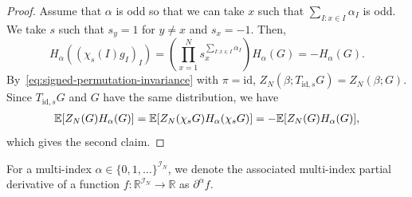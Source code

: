 \documentclass[../CLT_SYK.tex]{subfiles}
\begin{document}
\begin{proof}
Assume that $\alpha$ is odd so that  we can take $x$ such that
$\sum_{I:x\in I}\alpha_I$ is odd.  We take $s$ such that $s_y=1$ for
$y\neq x$ and $s_x=-1$.  Then,
 \[
  H_\alpha((\chi_s(I)g_I)_I)
  =
  \left(
    \prod_{x=1}^N
    s_x^{{\sum_{I:x\in I}}\alpha_I}
  \right)H_\alpha(G) = -H_\alpha(G).
\]
{
By~\eqref{eq:signed-permutation-invariance} with $\pi=\mathrm{id}$,
$Z_N(\beta;T_{\mathrm{id},s}G)=Z_N(\beta;G)$.
Since $T_{\mathrm{id},s}G$ and $G$ have the same distribution}, we have
\begin{align*}{
\mathbb E[Z_N(G) H_\alpha(G)] = \mathbb E[Z_N(\chi_s G) H_\alpha(\chi_s G)] = -
\mathbb E[Z_N(G) H_\alpha(G)]}, 
\end{align*}
which gives the second claim.
\end{proof}

For a multi-index $\alpha \in \{0,1,\ldots\}^{\mathcal I_N}$, we denote the associated multi-index partial derivative of a function $f\colon \mathbb R^{\mathcal I_N} \to \mathbb R$ as $\partial^\alpha f$.
\end{document}
